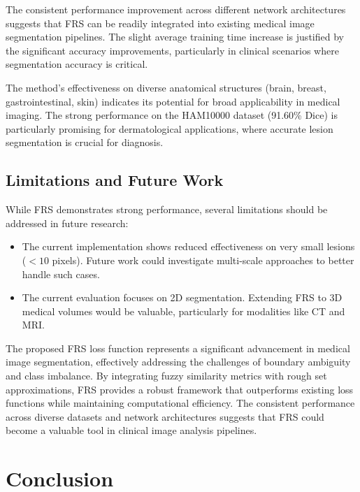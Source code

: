 \documentclass[review]{elsarticle}
\begin{document}
The consistent performance improvement across different network architectures suggests that FRS can be readily integrated into existing medical image segmentation pipelines. The slight average training time increase is justified by the significant accuracy improvements, particularly in clinical scenarios where segmentation accuracy is critical.

The method's effectiveness on diverse anatomical structures (brain, breast, gastrointestinal, skin) indicates its potential for broad applicability in medical imaging. The strong performance on the HAM10000 dataset (91.60\% Dice) is particularly promising for dermatological applications, where accurate lesion segmentation is crucial for diagnosis.

\subsection{Limitations and Future Work}

While FRS demonstrates strong performance, several limitations should be addressed in future research:

\begin{itemize}
    \item The current implementation shows reduced effectiveness on very small lesions (\(<10\) pixels). Future work could investigate multi-scale approaches to better handle such cases.
   
    
    \item The current evaluation focuses on 2D segmentation. Extending FRS to 3D medical volumes would be valuable, particularly for modalities like CT and MRI.
\end{itemize}



The proposed FRS loss function represents a significant advancement in medical image segmentation, effectively addressing the challenges of boundary ambiguity and class imbalance. By integrating fuzzy similarity metrics with rough set approximations, FRS provides a robust framework that outperforms existing loss functions while maintaining computational efficiency. The consistent performance across diverse datasets and network architectures suggests that FRS could become a valuable tool in clinical image analysis pipelines.

\section{Conclusion}\label{conclusion}
\end{document}
